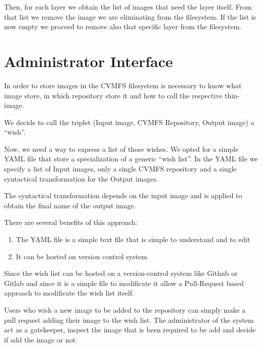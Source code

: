 Then, for each layer we obtain the list of images that need the layer itself. From that list we remove the image we are eliminating from the filesystem. If the list is now empty we proceed to remove also that specific layer from the filesystem.

\section{Administrator Interface}

In order to store images in the CVMFS filesystem is necessary to know what image store, in which repository store it and how to call the respective thin-image.

We decide to call the triplet (Input image, CVMFS Repository, Output image) a “wish”.

Now, we need a way to express a list of those wishes. We opted for a simple YAML file that store a specialization of a generic “wish list”. In the YAML file we specify a list of Input images, only a single CVMFS repository and a single syntactical transformation for the Output images.

The syntactical transformation depends on the input image and is applied to obtain the final name of the output image.

There are several benefits of this approach:
\begin{enumerate}
\item The YAML file is a simple text file that is simple to understand and to edit
\item It can be hosted on version control system
\end{enumerate}

Since the wish list can be hosted on a version-control system like Github or Gitlab and since it is a simple file to modificate it allow a Pull-Request based approach to modificate the wish list itself.

Users who wish a new image to be added to the repository can simply make a pull request adding their image to the wish list. The administrator of the system act as a gatekeeper, inspect the image that is been required to be add and decide if add the image or not.

